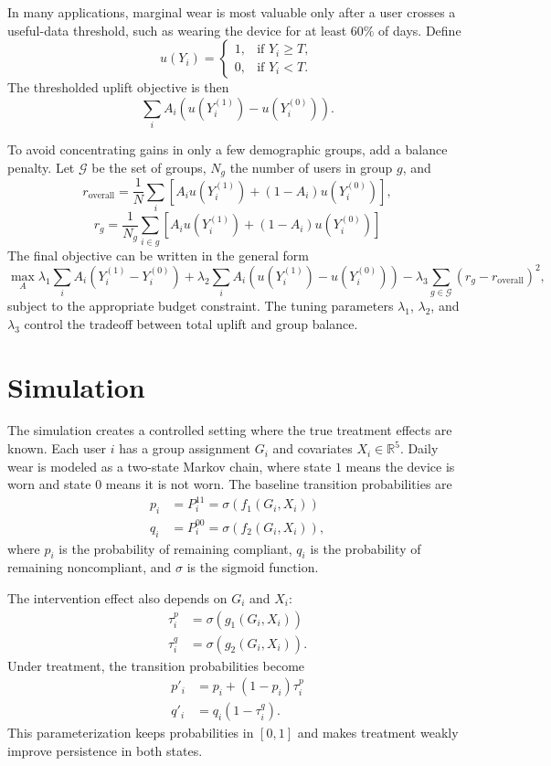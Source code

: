 \documentclass[12pt]{article}
\begin{document}
In many applications, marginal wear is most valuable only after a user crosses a useful-data threshold, such as wearing the device for at least $60\%$ of days. Define
\[
u(Y_i) = \begin{cases}
    1, & \text{if } Y_i \ge T, \\
    0, & \text{if } Y_i < T.
\end{cases}
\]
The thresholded uplift objective is then
\[
\sum_i A_i \left(u(Y^{(1)}_i) - u(Y^{(0)}_i)\right).
\]

To avoid concentrating gains in only a few demographic groups, add a balance penalty. Let $\mathcal{G}$ be the set of groups, $N_g$ the number of users in group $g$, and
\[
r_{\text{overall}} = \frac{1}{N}\sum_i \left[
A_i u(Y_i^{(1)})+(1-A_i)u(Y_i^{(0)})
\right],
\]
\[
r_g =
\frac{1}{N_g}
\sum_{i\in g}
\left[
A_i u(Y_i^{(1)})+(1-A_i)u(Y_i^{(0)})
\right]
\]
The final objective can be written in the general form
\[
\max_A \lambda_1 \sum_i A_i \left(Y^{(1)}_i - Y^{(0)}_i\right) + \lambda_2 \sum_i A_i \left(u(Y^{(1)}_i) - u(Y^{(0)}_i)\right)
- \lambda_3 \sum_{g \in \mathcal{G}} \left(r_g - r_{\text{overall}}\right)^2,
\]
subject to the appropriate budget constraint. The tuning parameters $\lambda_1$, $\lambda_2$, and $\lambda_3$ control the tradeoff between total uplift and group balance.

\section{Simulation}
The simulation creates a controlled setting where the true treatment effects are known. Each user $i$ has a group assignment $G_i$ and covariates $X_i \in \mathbb{R}^5$. Daily wear is modeled as a two-state Markov chain, where state $1$ means the device is worn and state $0$ means it is not worn. The baseline transition probabilities are
\begin{align*}
    p_i &= P_i^{11} = \sigma(f_1(G_i, X_i)) \\
    q_i &= P_i^{00} = \sigma(f_2(G_i, X_i)),
\end{align*}
where $p_i$ is the probability of remaining compliant, $q_i$ is the probability of remaining noncompliant, and $\sigma$ is the sigmoid function.

The intervention effect also depends on $G_i$ and $X_i$:
\begin{align*}
    \tau^p_i &= \sigma(g_1(G_i, X_i)) \\
    \tau^q_i &= \sigma(g_2(G_i, X_i)).
\end{align*}
Under treatment, the transition probabilities become
\begin{align*}
    p'_i &=  p_i + (1-p_i) \tau^p_i \\
    q'_i &=  q_i (1-\tau^q_i).
\end{align*}
This parameterization keeps probabilities in $[0,1]$ and makes treatment weakly improve persistence in both states.
\end{document}

